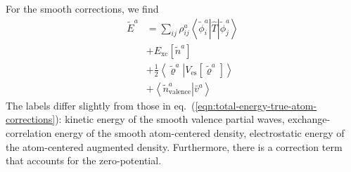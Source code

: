 \documentclass[oribibl]{llncs}
\newcommand{\um}[1]{_{\mathrm{#1}}}
\newcommand{\braket}[2]{\left\langle \left. #1 \right| #2 \right\rangle}
\newcommand{\braketop}[3]{\left\langle \left. #1 \right| #2 \left| #3 \right. \right\rangle}
\begin{document}
For the smooth corrections, we find
\begin{align}
  \tilde E^a &= \sum_{ij} \rho^a_{ij} \braketop{\tilde\phi^a_i}{\hat T}{\tilde\phi^a_j} \\
      &+ E\um{xc}[\tilde n^a] \\
      &+ \frac{1}{2} \braket{ \tilde\varrho^a }{ V\um{es}[\tilde\varrho^a]      }
      \label{trm:electrostatic-energy-smooth-atom-correction} \\
      &+ \braket{ \tilde n^a\um{valence} }{ \bar v^a } 
\end{align}
The labels differ slightly from those in eq.~(\ref{eqn:total-energy-true-atom-corrections}):
kinetic energy of the smooth valence partial waves,
exchange-correlation energy of the smooth atom-centered density,
electrostatic energy of the atom-centered augmented density.
Furthermore, there is a correction term that accounts for the zero-potential.
\end{document}
